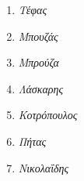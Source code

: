 \documentclass[a4paper,11pt]{article}
\begin{document}
	\begin{enumerate}[label=\textbf(\greek*)]
	\item \textit{Τέφας}
	\item \textit{Μπουζάς}
	\item \textit{Μπρούζα}
	\item \textit{Λάσκαρης}
	\item \textit{Κοτρόπουλος}
	\item \textit{Πήτας}
	\item \textit{Νικολαΐδης}	
	\end{enumerate}	


\end{document}
